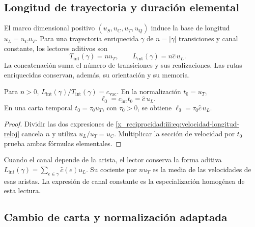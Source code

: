 \subsection{Longitud de trayectoria y duración elemental}

El marco dimensional positivo $(u_S,u_C,u_T,u_Q)$ induce la base de
longitud $u_L=u_Cu_T$. Para una trayectoria enriquecida $\gamma$ de
$n=|\gamma|$ transiciones y canal constante, los lectores aditivos son
\begin{equation}
 T_{\mathrm{int}}(\gamma)=nu_T,
 \qquad L_{\mathrm{int}}(\gamma)=n\widehat c\,u_L.
 \label{x_reciprocidad:iii:eq:velocidad-longitud-reloj}
\end{equation}
La concatenación suma el número de transiciones y sus realizaciones.
Las rutas enriquecidas conservan, además, su orientación y su memoria.

\begin{corollary}
Para $n>0$, $L_{\mathrm{int}}(\gamma)/T_{\mathrm{int}}(\gamma)
=c_{\mathrm{vac}}$. En la normalización $t_0=u_T$,
\begin{equation}
 \ell_0=c_{\mathrm{int}}t_0=\widehat c\,u_L.
 \label{x_reciprocidad:iii:eq:longitud-elemental-constitutiva}
\end{equation}
En una carta temporal $t_0=\tau_0u_T$, con $\tau_0>0$, se obtiene
$\ell_0=\tau_0\widehat c\,u_L$.
\end{corollary}
\begin{proof}
Dividir las dos expresiones de \eqref{x_reciprocidad:iii:eq:velocidad-longitud-reloj}
cancela $n$ y utiliza $u_L/u_T=u_C$. Multiplicar la sección de velocidad
por $t_0$ prueba ambas fórmulas elementales.
\end{proof}

Cuando el canal depende de la arista, el lector conserva la forma aditiva
$L_{\mathrm{int}}(\gamma)=\sum_{e\in\gamma}\widehat c(e)u_L$.
Su cociente por $nu_T$ es la media de las velocidades de esas aristas.
La expresión de canal constante es la especialización homogénea de
esta lectura.

\subsection{Cambio de carta y normalización adaptada}

